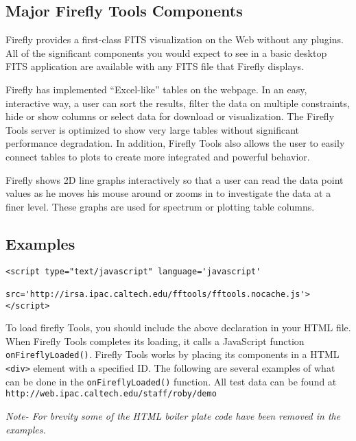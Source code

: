 \subsection*{Major Firefly Tools Components}
\small
{}
Firefly provides a first-class FITS visualization on the Web without any plugins. All of the significant components you would expect to see in a basic desktop FITS application are available with any FITS file that Firefly displays.

Firefly has implemented “Excel-like” tables on the webpage.  
In an easy, interactive way, a user can sort the results, filter the data on multiple constraints, 
hide or show columns or select data for download or visualization. 
The Firefly Tools server is optimized to show very large tables without significant performance degradation.
In addition, Firefly Tools also allows the user to easily connect tables to plots to create more integrated and powerful
behavior.

Firefly shows 2D line graphs interactively so that a user can read the data point values 
as he moves his mouse around or zooms in to investigate the data at a finer level. 
These graphs are used for spectrum or plotting table columns. 

\normalsize



\subsection*{Examples}

\scriptsize
\begin{verbatim}
<script type="text/javascript" language='javascript'
           src='http://irsa.ipac.caltech.edu/fftools/fftools.nocache.js'> </script>
\end{verbatim}
\normalsize
To load firefly Tools, you should include the above declaration in your HTML file.
When Firefly Tools completes its loading, it calls a JavaScript function 
\scriptsize \texttt{onFireflyLoaded()}\normalsize.  
Firefly Tools works by placing its components in a HTML \scriptsize\texttt{<div>} \normalsize element 
with a specified ID.  
The following are several examples of what can be done in 
the \scriptsize \texttt{onFireflyLoaded()} \normalsize function.
All test data can be found at \scriptsize \texttt{http://web.ipac.caltech.edu/staff/roby/demo} \normalsize

\small
\textit{Note- For brevity some of the HTML boiler plate code have been removed in the examples.}
\normalsize



